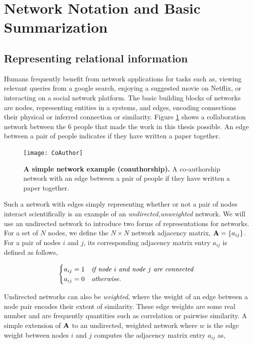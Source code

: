\section{Network Notation and Basic Summarization}

\subsection{Representing relational information}

Humans frequently benefit from network applications for tasks such as, viewing relevant queries from a google search, enjoying a suggested movie on Netflix, or interacting on a social network platform. The basic building blocks of networks are nodes, representing entities in a systems, and edges, encoding connections their physical or inferred connection or similarity. Figure \ref{fig:social} shows a collaboration network between the 6 people that made the work in this thesis possible. An edge between a pair of people indicates if they have written a paper together. 
\begin{figure}[h!]
\begin{center}
\texttt{[image: CoAuthor]}
\caption{{\bf A simple network example (coauthorship).} A co-authorship network with an edge between a pair of people if they have written a paper together.}
\label{fig:social}
\end{center}
\end{figure}

Such a network with edges simply representing whether or not a pair of nodes interact scientifically is an example of an \emph{undirected,unweighted} network. We will use an undirected network to introduce two forms of representations for networks. For a set of $N$ nodes, we define the $N \times N$ network adjacency matrix, ${\bf A}=\{a_{ij}\}$. For a pair of nodes $i$ and $j$, its corresponding adjacency matrix entry $a_{ij}$ is defined as follows,

\[ \begin{cases} 
     a_{ij}=1 & \text{\emph{if node $i$ and node $j$ are connected}} \\
      a_{ij}=0 & \text{\emph{otherwise}}.
         \end{cases}
\]

Undirected networks can also be \emph{weighted}, where the weight of an edge between a node pair encodes their extent of similarity. These edge weights are some real number and are frequently quantities such as correlation or pairwise similarity. A simple extension of ${\bf A}$ to an undirected, weighted network where $w$ is the edge weight between nodes $i$ and $j$ computes the adjacency matrix entry $a_{ij}$ as, 

